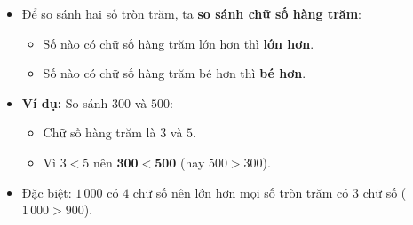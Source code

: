 \documentclass[10pt,a4paper]{article}
\begin{document}
\noindent
\begin{minipage}[t]{0.49\textwidth}\vspace{0pt}
\begin{tcolorbox}[
  enhanced,
  colback=violet!4!white,
  colframe=violet!75!black,
  arc=2mm, boxrule=0.8pt,
  left=2mm, right=2mm, top=1.8mm, bottom=1.8mm,
  title={\footnotesize\bfseries\color{white}\faKey\ 1. So sánh các số tròn trăm}
]
{\footnotesize
\begin{itemize}\setlength{\itemsep}{1pt}\setlength{\leftskip}{-2.5mm}
  \item Để so sánh hai số tròn trăm, ta \textbf{so sánh chữ số hàng trăm}:
  \begin{itemize}\setlength{\itemsep}{0.5pt}\setlength{\leftskip}{-2mm}
    \item Số nào có chữ số hàng trăm lớn hơn thì \textbf{lớn hơn}.
    \item Số nào có chữ số hàng trăm bé hơn thì \textbf{bé hơn}.
  \end{itemize}
  \item \textbf{Ví dụ:} So sánh $300$ và $500$:
  \begin{itemize}\setlength{\itemsep}{0.5pt}\setlength{\leftskip}{-2mm}
    \item Chữ số hàng trăm là $3$ và $5$.
    \item Vì $3 < 5$ nên $\mathbf{300 < 500}$ (hay $500 > 300$).
  \end{itemize}
  \item Đặc biệt: $1\,000$ có $4$ chữ số nên lớn hơn mọi số tròn trăm có $3$ chữ số ($1\,000 > 900$).
\end{itemize}
}
\end{tcolorbox}
\end{minipage}
\hfill
\end{document}
